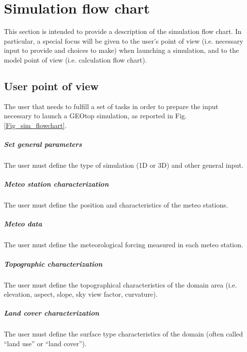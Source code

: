 \chapter{Simulation flow chart}

This section is intended to provide a description of the simulation flow chart. In particular, a special focus will be given to the user's point of view (i.e. necessary input to provide and choices to make) when launching a simulation, and to the model point of view (i.e. calculation flow chart).

\section{User point of view}
The user that needs to fulfill a set of tasks in order to prepare the input necessary to launch a GEOtop simulation, as reported in Fig. \ref{Fig_sim_flowchart}.

\paragraph{Set general parameters}
 The user must define the type of simulation (1D or 3D) and other general input.

\paragraph{Meteo station characterization}
The user must define the position and characteristics of the meteo stations.

\paragraph{Meteo data}
The user must define the meteorological forcing measured in each meteo station.

\paragraph{Topographic characterization}
The user must define the topographical characteristics of the domain area (i.e. elevation, aspect, slope, sky view factor, curvature).

\paragraph{Land cover characterization}
The user must define the surface type characteristics of the domain (often called ``land use'' or ``land cover'').

